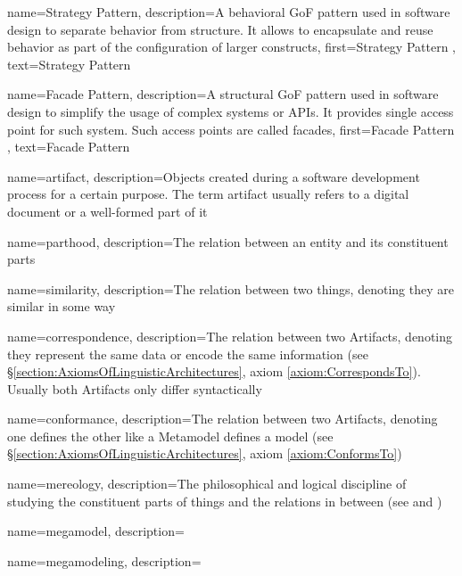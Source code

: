 {
    name={Strategy Pattern},
    description={A behavioral \gls{GoF} pattern used in software design to separate behavior from structure. It allows to encapsulate and reuse behavior as part of the configuration of larger constructs},
    first={Strategy Pattern \cite{Gamma:1995:DPE:186897}},
    text={Strategy Pattern}
}

{
    name={Facade Pattern},
    description={A structural \gls{GoF} pattern used in software design to simplify the usage of complex systems or \glspl{API}. It provides single access point for such system. Such access points are called facades},
    first={Facade Pattern \cite{Gamma:1995:DPE:186897}},
    text={Facade Pattern}
}

{
    name={artifact},
    description={Objects created during a software development process for a certain purpose. The term artifact usually refers to a digital document or a well-formed part of it}
}

{
    name={parthood},
    description={The relation between an entity and its constituent parts}
}

{
    name={similarity},
    description={The relation between two things, denoting they are similar in some way}
}

{
    name={correspondence},
    description={The relation between two \glspl{Artifact}, denoting they represent the same data or encode the same information (see §\ref{section:AxiomsOfLinguisticArchitectures}, axiom \ref{axiom:CorrespondsTo}). Usually both \glspl{Artifact} only differ syntactically}
}

{
    name={conformance},
    description={The relation between two \glspl{Artifact}, denoting one defines the other like a \gls{Metamodel} defines a model (see §\ref{section:AxiomsOfLinguisticArchitectures}, axiom \ref{axiom:ConformsTo})}
}

{
    name={mereology},
    description={The philosophical and logical discipline of studying the constituent parts of things and the relations in between (see \cite{DBLP:journals/dke/Varzi96} and \cite{SEP:Mereology})}
}

{
    name={megamodel},
    description={}
}

{
    name={megamodeling},
    description={}
}

